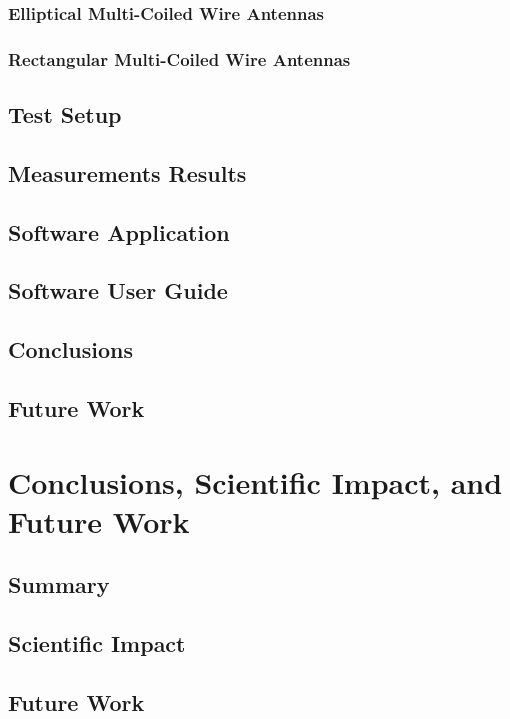 \documentclass[12pt,onecolumn]{report}
\begin{document}
        \subsection{Elliptical Multi-Coiled Wire Antennas}
        \subsection{Rectangular Multi-Coiled Wire Antennas}
    \section{Test Setup}
    \section{Measurements Results}
    \section{Software Application}
    \section{Software User Guide} 
    \section{Conclusions}
    \section{Future Work}
    
\chapter{Conclusions, Scientific Impact, and Future Work}
    \section{Summary}
    \section{Scientific Impact}
    \section{Future Work}


\clearpage
{}
\nocite{*}
\printbibliography
%
%
\end{document}
